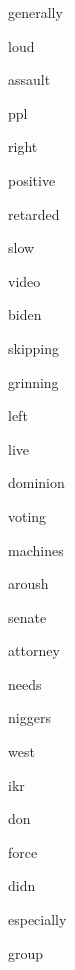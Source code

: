 \documentclass[varwidth]{standalone}
\begin{document}
\begin{CJK*}{UTF8}{gbsn}
{{{\colorbox{red!2.3711400032043457}{\strut generally}
\colorbox{red!2.5323123931884766}{\strut loud}
\colorbox{red!3.1657724380493164}{\strut assault}
\colorbox{red!16.495563507080078}{\strut ppl}
\colorbox{red!4.716872692108154}{\strut right}
\colorbox{red!6.114371299743652}{\strut positive}
\colorbox{red!8.593388557434082}{\strut retarded}
\colorbox{red!2.4875946044921875}{\strut slow}
\colorbox{red!5.5135498046875}{\strut video}
\colorbox{red!7.040728569030762}{\strut biden}
\colorbox{red!6.181982040405273}{\strut skipping}
\colorbox{red!1.103881597518921}{\strut grinning}
\colorbox{red!1.6442995071411133}{\strut left}
\colorbox{red!4.963993072509766}{\strut live}
\colorbox{red!13.280632019042969}{\strut dominion}
\colorbox{red!0.6692404747009277}{\strut voting}
\colorbox{red!0.3512864112854004}{\strut machines}
\colorbox{red!12.606794357299805}{\strut aroush}
\colorbox{red!1.8434171676635742}{\strut senate}
\colorbox{red!2.6500678062438965}{\strut attorney}
\colorbox{red!2.2928524017333984}{\strut needs}
\colorbox{red!9.830390930175781}{\strut niggers}
\colorbox{red!1.6854877471923828}{\strut west}
\colorbox{red!15.2787446975708}{\strut ikr}
\colorbox{red!8.182188034057617}{\strut don}
\colorbox{red!6.77549409866333}{\strut force}
\colorbox{red!1.230191946029663}{\strut didn}
\colorbox{red!3.664896011352539}{\strut especially}
\colorbox{red!7.786481857299805}{\strut group}

}}}
\end{CJK*}
\end{document}
